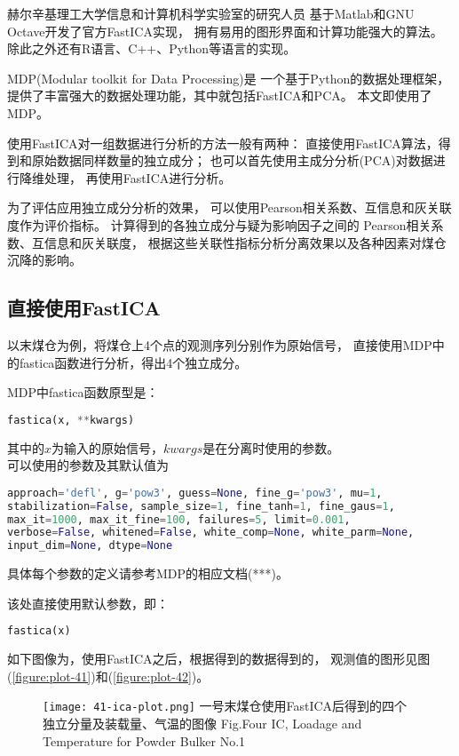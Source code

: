 赫尔辛基理工大学信息和计算机科学实验室的研究人员
基于Matlab和GNU Octave开发了官方FastICA实现，
拥有易用的图形界面和计算功能强大的算法。
除此之外还有R语言、C++、Python等语言的实现。

MDP(Modular toolkit for Data Processing)是
一个基于Python的数据处理框架，
提供了丰富强大的数据处理功能，其中就包括FastICA和PCA。
本文即使用了MDP。

使用FastICA对一组数据进行分析的方法一般有两种：
直接使用FastICA算法，得到和原始数据同样数量的独立成分；
也可以首先使用主成分分析(PCA)对数据进行降维处理，
再使用FastICA进行分析。   

为了评估应用独立成分分析的效果，
可以使用Pearson相关系数、互信息和灰关联度作为评价指标。
计算得到的各独立成分与疑为影响因子之间的
Pearson相关系数、互信息和灰关联度，
根据这些关联性指标分析分离效果以及各种因素对煤仓沉降的影响。

\subsection{直接使用FastICA}
以末煤仓为例，将煤仓上4个点的观测序列分别作为原始信号，
直接使用MDP中的fastica函数进行分析，得出4个独立成分。

MDP中fastica函数原型是：
\begin{lstlisting}[language=Python, basicstyle=\ttfamily]
fastica(x, **kwargs)
\end{lstlisting}
其中的$x$为输入的原始信号，$kwargs$是在分离时使用的参数。\\
可以使用的参数及其默认值为
\begin{lstlisting}[language=Python, basicstyle=\ttfamily]
approach='defl', g='pow3', guess=None, fine_g='pow3', mu=1, 
stabilization=False, sample_size=1, fine_tanh=1, fine_gaus=1,
max_it=1000, max_it_fine=100, failures=5, limit=0.001, 
verbose=False, whitened=False, white_comp=None, white_parm=None,
input_dim=None, dtype=None
\end{lstlisting}
具体每个参数的定义请参考MDP的相应文档(***)。

该处直接使用默认参数，即：
\begin{lstlisting}[language=Python, basicstyle=\ttfamily]
fastica(x)
\end{lstlisting}
如下图像为，使用FastICA之后，根据得到的数据得到的，
观测值的图形见图(\ref{figure:plot-41})和(\ref{figure:plot-42})。

\begin{figure}[!htbp]
   \centering
   \texttt{[image: 41-ica-plot.png]}
				    {一号末煤仓使用FastICA后得到的四个独立分量及装载量、气温的图像}
			{Fig.}{Four IC, Loadage and Temperature for Powder Bulker No.1}
\end{figure}

